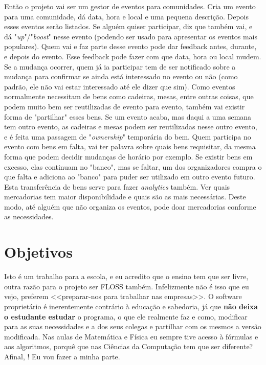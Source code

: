 \documentclass[12pt,a4paper,openright,oneside]{memoir}
\begin{document}
Então o projeto vai ser um gestor de eventos para comunidades. Cria um evento
para uma comunidade, dá data, hora e local e uma pequena descrição. Depois
esses eventos serão listados. Se alguém quiser participar, diz que também vai,
e dá "\textit{up}"/"\textit{boost}" nesse evento (podendo ser usado para
apresentar os eventos mais populares). Quem vai e faz parte desse evento pode
dar feedback antes, durante, e depois do evento. Esse feedback pode fazer com
que data, hora ou local mudem. Se a mudança ocorrer, quem já ia participar tem
de ser notificado sobre a mudança para confirmar se ainda está interessado no
evento ou não (como padrão, ele não vai estar interessado até ele dizer que
sim). Como eventos normalmente necessitam de bens como cadeiras, mesas, entre
outras coisas, que podem muito bem ser reutilizadas de evento para evento,
também vai existir forma de "partilhar" esses bens. Se um evento acaba, mas
daqui a uma semana tem outro evento, as cadeiras e mesas podem ser reutilizadas
nesse outro evento, e é feita uma passagem de "\textit{ownership}" temporária
do bem. Quem participa no evento com bens em falta, vai ter palavra sobre quais
bens requisitar, da mesma forma que podem decidir mudanças de horário por
exemplo. Se existir bens em excesso, elas continuam no "banco", mas se faltar,
um dos organizadores compra o que falta e adiciona ao "banco" para puder ser
utilizado em outro evento futuro. Esta transferência de bens serve para fazer
\textit{analytics} também. Ver quais mercadorias tem maior disponibilidade e
quais são as mais necessárias. Deste modo, até alguém que não organiza os
eventos, pode doar mercadorias conforme as necessidades.

\section{Objetivos}

Isto é um trabalho para a escola, e eu acredito que o ensino tem que ser livre,
outra razão para o projeto ser FLOSS também. Infelizmente não é isso que eu
vejo, preferem <<preparar-nos para trabalhar nas empresas>>. O software
proprietário é inerentemente contrário à educação e sabedoria, já que
\textbf{não deixa o estudante estudar} o programa, o que ele realmente faz e
como, modificar para as suas necessidades e a dos seus colegas e partilhar com
os mesmos a versão modificada. Nas aulas de Matemática e Física eu sempre tive
acesso à fórmulas e aos algoritmos, porquê que nas Ciências da Computação tem
que ser diferente? Afinal, \autocite{guimaraesPitagoras}! Eu vou fazer a minha
parte.
\end{document}
